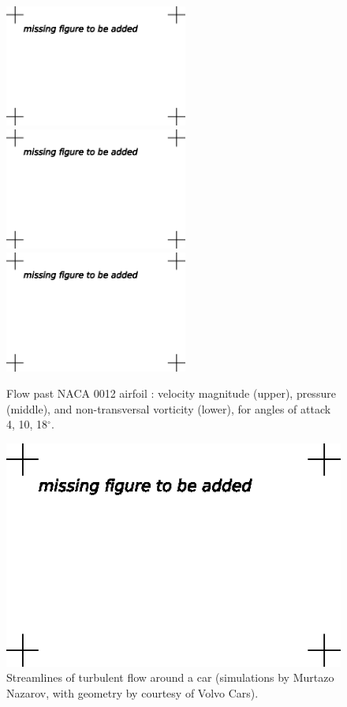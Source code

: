 \begin{figure}[bhpt]
{}
\centerline{
\includegraphics[height=4cm]{chapters/hoffman-1/eps/naca_0012-vort1-xz-aoa4-bw.eps}
\includegraphics[height=4cm]{chapters/hoffman-1/eps/naca_0012-vort1-xz-aoa10-bw.eps}
\includegraphics[height=4cm]{chapters/hoffman-1/eps/naca_0012-vort1-xz-aoa18-bw.eps}
}
\caption{Flow past NACA 0012 airfoil \cite{HoffmanJohnson2006}: velocity magnitude (upper), pressure (middle), and non-transversal vorticity (lower), for angles of attack 4, 10, 18$^\circ$.}
\label{fig:naca}
\end{figure}

\begin{figure}[bhpt]

\centerline{
\includegraphics[width=12cm]{chapters/hoffman-1/eps/volvo_car-bw.eps}
}
\caption{Streamlines of turbulent flow around a car (simulations by Murtazo Nazarov, with geometry by courtesy of Volvo Cars).}
\label{fig:volvo}
\end{figure}

